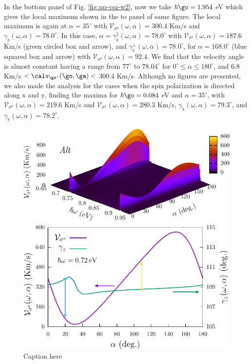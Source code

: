 \documentclass[prb,11pt,tightenlines,twocolumn,aps]{revtex4-1}
\begin{document}
In the bottom panel of Fig. \ref{fig:up-vsz-w2}, now we take
$\hbar\go=1.954$ eV which gives the local maximum 
shown in the to panel of same figure. 
The local maximum is
again at  $\alpha = 35^{\circ}$ with
$\mathcal{V}_{\sigma^{\mathrm{z}}} (\omega,\alpha) =
300.4$ Km/s and $\gamma_{\mathrm{z}}(\omega,\alpha) =
78.0^{\circ}$.
% 
In this case, $\alpha =\gamma_{\mathrm{z}}^\parallel(\omega,\alpha) =
78.0^{\circ}$ with $\mathcal{V}_{\sigma^{\mathrm{z}}}(\omega,\alpha) = 187.6$
Km/s (green circled box and arrow), and
$\gamma_{\mathrm{z}}^\perp(\omega,\alpha) = 78.0^{\circ}$, for $\alpha =168.0^
{\circ}$ (blue squared box and arrow) with $\mathcal{V}_{\sigma^{\mathrm{z}}}
(\omega,\alpha) = 92.4$.
% 
We find  that the velocity angle is almost constant having a range from
$77^{\circ}$ to $78.04^{\circ}$ for  $0^{\circ} \leq
\alpha \leq 180^{\circ}$, and 6.8 Km/s $<\calv_{\gs^z}(\go,\ga)<$ 300.4 Km/s.
% 
Although no figures are presented, we also made the analysis for the
cases when the spin polarization is directed 
along $\mathrm{x}$ and $\mathrm{y}$, finding 
the maxima for
$\hbar\go=0.084$ eV and $\alpha=35^{\circ}$, with
$\mathcal{V}_{\sigma^{\mathrm{x}}}(\omega,\alpha)=219.6$ Km/s and
$\mathcal{V}_{\sigma^{\mathrm{y}}}(\omega,\alpha)=280.3$ Km/s,
$\gamma_{\mathrm{x}}(\omega,\alpha) = 79.3^{\circ}$, and 
$\gamma_{\mathrm{y}}(\omega,\alpha) = 78.2^{\circ}$.


\begin{figure}[tb]
    \centering
    \includegraphics[width=\linewidth]{altplots/alt-vsz}
    \caption{Caption here}
    \label{fig:alt-vsz}
\end{figure}
\end{document}
